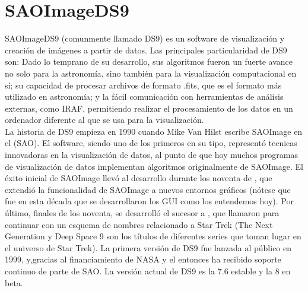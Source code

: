 \documentclass[12pt]{article}
\begin{document}
\section{SAOImageDS9}
SAOImageDS9 (comunmente llamado DS9) es un software de visualización y creación de imágenes a partir de datos. Las principales particularidad de DS9 son: Dado lo temprano de su desarrollo, sus algoritmos fueron un fuerte avance no solo para la astronomía, sino también para la visualización computacional en sí; su capacidad de procesar archivos de formato .fits, que es el formato más utilizado en astronomía; y la fácil comunicación con herramientas de análisis externas, como IRAF, permitiendo realizar el procesamiento de los datos en un ordenador diferente al que se usa para la visualización.\\
La historia de DS9 empieza en 1990 cuando Mike Van Hilst escribe SAOImage en el  (SAO). El software, siendo uno de los primeros en su tipo, representó tecnicas innovadoras en la visualización de datos, al punto de que hoy muchos programas de visualización de datos implementan algoritmos originalmente de SAOImage. El éxito inicial de SAOImage llevó al desarrollo durante los noventa de , que extendió la funcionalidad de SAOImage a nuevos entornos gráficos (nótese que fue en esta década que se desarrollaron los GUI como los entendemos hoy). Por último, finales de los noventa, se desarrolló el sucesor a , que llamaron  para continuar con un esquema de nombres relacionado a Star Trek (The Next Generation y Deep Space 9 son los títulos de diferentes series que toman lugar en el universo de Star Trek). La primera versión de DS9 fue lanzada al público en 1999, y,gracias al financiamiento de NASA y el  entonces ha recibido soporte continuo de parte de SAO. La versión actual de DS9 es la 7.6 estable y la 8 en beta.\cite{ds9}
\end{document}
